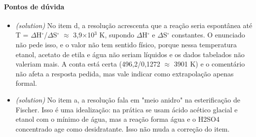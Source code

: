 \documentclass{article}%
\begin{document}
\paragraph{Pontos de dúvida}%
\begin{itemize}%
\item%
\textit{(solution)} No item d, a resolução acrescenta que a reação seria espontânea até T = $\Delta$H$^\circ$/$\Delta$S$^\circ$ $\approx$ 3,9$\times$10$^3$ K, supondo $\Delta$H$^\circ$ e $\Delta$S$^\circ$ constantes. O enunciado não pede isso, e o valor não tem sentido físico, porque nessa temperatura etanol, acetato de etila e água não seriam líquidos e os dados tabelados não valeriam mais. A conta está certa (496,2/0,1272 $\approx$ 3901 K) e o comentário não afeta a resposta pedida, mas vale indicar como extrapolação apenas formal.%
\item%
\textit{(solution)} No item a, a resolução fala em "meio anidro" na esterificação de Fischer. Isso é uma idealização: na prática se usam ácido acético glacial e etanol com o mínimo de água, mas a reação forma água e o H2SO4 concentrado age como desidratante. Isso não muda a correção do item.%
\end{itemize}%
\end{document}
